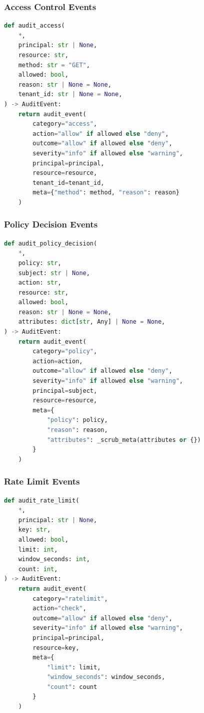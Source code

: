 \subsubsection{Access Control Events}

\begin{lstlisting}[language=Python,caption={Access control audit helper}]
def audit_access(
    *,
    principal: str | None,
    resource: str,
    method: str = "GET",
    allowed: bool,
    reason: str | None = None,
    tenant_id: str | None = None,
) -> AuditEvent:
    return audit_event(
        category="access",
        action="allow" if allowed else "deny",
        outcome="allow" if allowed else "deny",
        severity="info" if allowed else "warning",
        principal=principal,
        resource=resource,
        tenant_id=tenant_id,
        meta={"method": method, "reason": reason}
    )
\end{lstlisting}

\subsubsection{Policy Decision Events}

\begin{lstlisting}[language=Python,caption={Policy decision audit helper}]
def audit_policy_decision(
    *,
    policy: str,
    subject: str | None,
    action: str,
    resource: str,
    allowed: bool,
    reason: str | None = None,
    attributes: dict[str, Any] | None = None,
) -> AuditEvent:
    return audit_event(
        category="policy",
        action=action,
        outcome="allow" if allowed else "deny",
        severity="info" if allowed else "warning",
        principal=subject,
        resource=resource,
        meta={
            "policy": policy, 
            "reason": reason, 
            "attributes": _scrub_meta(attributes or {})
        }
    )
\end{lstlisting}

\subsubsection{Rate Limit Events}

\begin{lstlisting}[language=Python,caption={Rate limit audit helper}]
def audit_rate_limit(
    *,
    principal: str | None,
    key: str,
    allowed: bool,
    limit: int,
    window_seconds: int,
    count: int,
) -> AuditEvent:
    return audit_event(
        category="ratelimit",
        action="check",
        outcome="allow" if allowed else "deny",
        severity="info" if allowed else "warning",
        principal=principal,
        resource=key,
        meta={
            "limit": limit, 
            "window_seconds": window_seconds, 
            "count": count
        }
    )
\end{lstlisting}

